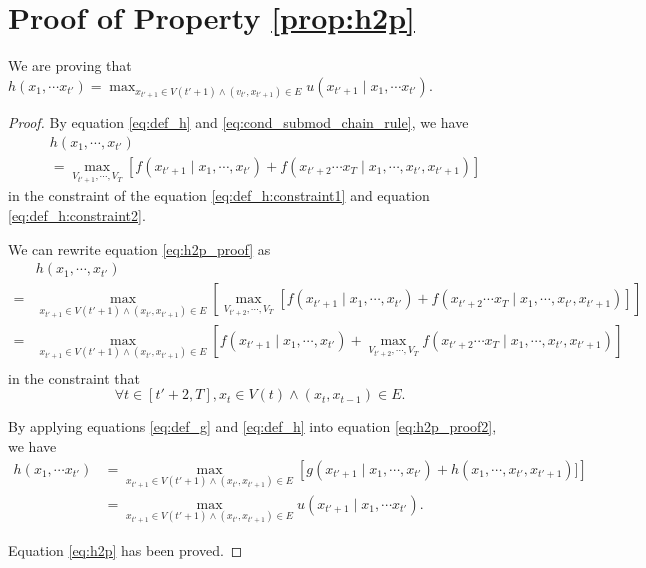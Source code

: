 \section{Proof of Property \ref{prop:h2p}}
\label{app:proof_prop_h2p}

We are proving that $ h( x_{1}, \cdots x_{t'} ) = \max_{x_{t'+1} \in V(t'+1) \land (v_{t'}, x_{t'+1}) \in E} u(x_{t'+1} \mid x_{1}, \cdots x_{t'} ) $.

\begin{proof}

By equation \eqref{eq:def_h} and \eqref{eq:cond_submod_chain_rule}, we have
\begin{equation}
\label{eq:h2p_proof}
\begin{aligned}
& h(x_{1} , \cdots, x_{t'} ) \\
& = \max_{V_{t'+1}, \cdots , V_{T}} [ f(x_{t'+1} \mid  x_{1}, \cdots , x_{t'}) + f(x_{t'+2} \cdots x_{T} \mid x_{1}, \cdots , x_{t'}, x_{t'+1}) ] 
\end{aligned}
\end{equation}
in the constraint of the equation \eqref{eq:def_h:constraint1} and equation \eqref{eq:def_h:constraint2}.

We can rewrite equation \eqref{eq:h2p_proof} as
\begin{equation}
\label{eq:h2p_proof2}
\begin{aligned}
& h(x_{1} , \cdots, x_{t'} ) \\
= & \max_{ x_{t'+1} \in V(t'+1) \land ( x_{t'}, x_{t'+1} ) \in E } \left[  \max_{V_{t'+2}, \cdots , V_{T}} [ f(x_{t'+1} \mid  x_{1}, \cdots , x_{t'}) + f(x_{t'+2} \cdots x_{T} \mid x_{1}, \cdots , x_{t'}, x_{t'+1}) ] \right] \\
= & \max_{ x_{t'+1} \in V(t'+1) \land ( x_{t'}, x_{t'+1} ) \in E } \left[ f(x_{t'+1} \mid  x_{1}, \cdots , x_{t'}) + \max_{V_{t'+2}, \cdots , V_{T}} f(x_{t'+2} \cdots x_{T} \mid x_{1}, \cdots , x_{t'}, x_{t'+1}) \right] \\
\end{aligned}
\end{equation}
in the constraint that
\begin{equation}
\forall t \in [t'+2, T], x_{t} \in V(t) \land ( x_{t}, x_{t-1} ) \in E. 
\end{equation}


By applying equations \eqref{eq:def_g} and \eqref{eq:def_h} into equation \eqref{eq:h2p_proof2}, we have
\begin{equation}
\begin{aligned}
h( x_{1}, \cdots x_{t'} )  & = \max_{ x_{t'+1} \in V(t'+1) \land ( x_{t'}, x_{t'+1} ) \in E } \left[  g(x_{t'+1} \mid  x_{1}, \cdots , x_{t'}) + h( x_{1}, \cdots , x_{t'}, x_{t'+1}) ] \right] \\
& = \max_{ x_{t'+1} \in V(t'+1) \land ( x_{t'}, x_{t'+1} ) \in E } u(x_{t'+1} \mid x_{1}, \cdots x_{t'} ).
\end{aligned}
\end{equation}

Equation \eqref{eq:h2p} has been proved.

\end{proof}